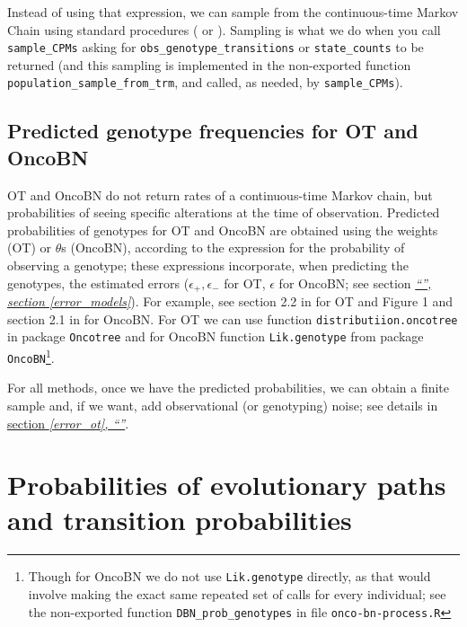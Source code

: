 \documentclass[a4paper,11pt]{article}
\newcommand*{\qrefP}[1]{\hyperref[{#1}]{\textit{``\nameref*{#1}'', section \ref*{#1}}}}
\newcommand*{\qrefS}[1]{\hyperref[{#1}]{section \textit{\ref*{#1},
      ``\nameref*{#1}''}}}
\begin{document}
Instead of using that expression, we can sample from the continuous-time Markov Chain using standard procedures (\citealp[e.g., ch.~5 in][]{wilkinson2019stochastic} or \citealp[Algorithm 1 in][]{gotovos2021}). Sampling is what we do when you call \texttt{sample\_CPMs} asking for \texttt{obs\_genotype\_transitions} or \texttt{state\_counts} to be returned (and this sampling is implemented in the non-exported function \texttt{population\_sample\_from\_trm}, and called, as needed, by \texttt{sample\_CPMs}).




\subsection{Predicted genotype frequencies for OT and OncoBN}
\label{predicted-ot-oncobn}

OT and OncoBN do not return rates of a continuous-time Markov chain, but probabilities of seeing specific alterations at the time of observation. 
Predicted probabilities of genotypes for OT and OncoBN are obtained using the weights (OT) or $\theta$s (OncoBN), according to the expression for the probability of observing a genotype; these expressions incorporate, when predicting the genotypes, the estimated errors ($\epsilon_+, \epsilon_-$ for OT, $\epsilon$ for OncoBN; see section \qrefP{error_models}). For example, see section 2.2 in \cite{Szabo2008} for OT and Figure 1 and section 2.1 in \cite{nicol2021oncogenetic} for OncoBN. For OT we can use function \texttt{distributiion.oncotree} in package \texttt{Oncotree} and for OncoBN function \texttt{Lik.genotype} from package \texttt{OncoBN}\footnote{Though for OncoBN we do not use \texttt{Lik.genotype} directly, as that would involve making the exact same repeated set of calls for every individual; see the non-exported function \texttt{DBN\_prob\_genotypes} in file \texttt{onco-bn-process.R}}.



For all methods, once we have the predicted probabilities, we can obtain a finite sample and, if we want, add observational (or genotyping) noise; see details in \qrefS{error_ot}.


\section{Probabilities of evolutionary paths and transition probabilities}\label{probpaths}
\end{document}
